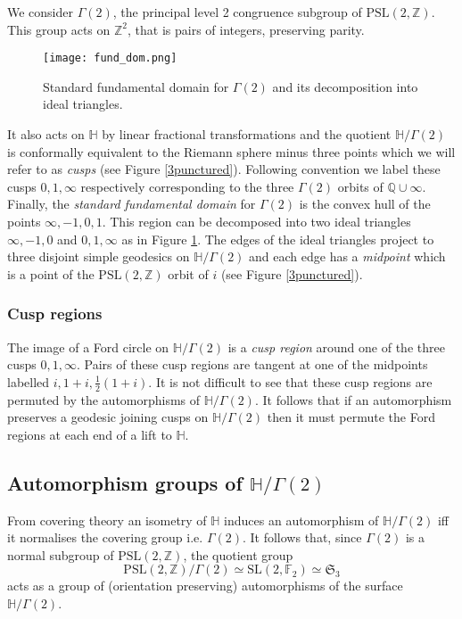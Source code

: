 \documentclass[12pt]{amsart}
\theoremstyle{plain}
\theoremstyle{definition}
\def\HH{\mathbb{H}}
\def\xx{\HH/g2}
\def\ZZ{\mathbb{Z}}
\def\QQ{\mathbb{Q}}
\def\sl2{\mathrm{PSL}(2, \ZZ)}
\def\g2{\Gamma(2)}
\def\xx{\HH/\g2}
\begin{document}
We consider $\g2$,
the principal level 2 congruence subgroup of $\sl2$.
This group acts on $\ZZ^2$, that is pairs of integers,  preserving parity.

 \begin{figure}[hb]
\begin{center}
\texttt{[image: fund\_dom.png]} 
\end{center}
\caption{Standard fundamental domain for $\g2$ and its decomposition into ideal triangles.}
\label{fund}
\end{figure}


It also acts on $\HH$ by linear fractional transformations
and the  quotient $\xx$ is conformally equivalent to the Riemann  sphere minus three points
which we will refer to as \textit{cusps}
(see Figure \ref{3punctured}). 
Following  convention we label these cusps $0,1,\infty$ respectively
corresponding to the three $\g2$ orbits of $\QQ \cup \infty$. 
Finally, the \textit{standard fundamental domain}  for $\g2$ 
is the convex hull of the points $\infty, -1, 0 , 1$.
This region can be decomposed into two ideal triangles 
$\infty, -1, 0 $ and $ 0 , 1,\infty$ as in Figure \ref{fund}.
The edges of the ideal triangles project to three disjoint simple geodesics on $\xx$
and each edge has a \textit{midpoint} 
which is a point of the $\sl2$ orbit of $i$ (see Figure \ref{3punctured}).



\subsubsection{Cusp regions}

The image of a Ford circle on $\xx$ is a \textit{cusp region}
around one of the three cusps $0,1,\infty$.
Pairs of these cusp regions are tangent at one of the midpoints
labelled $i, 1+i, \frac12(1+i)$.
It is not difficult to see that these cusp regions 
are permuted by the automorphisms of $\xx$.
It follows that if an automorphism preserves a geodesic  joining cusps on $\xx$
then it must permute the Ford regions at each end of a lift to $\HH$.


\subsection{Automorphism groups of $\xx$}
From covering theory an isometry  of $\HH$ 
induces an automorphism of $\xx$ iff it normalises the covering group
i.e. $\g2$.
It follows that,
since $\g2$ is a normal subgroup of $\sl2$,
 the quotient group
 $$ \sl2/\g2 \simeq \mathrm{SL}(2, \mathbb{F}_2) \simeq \mathfrak{S}_3$$
acts as a group of (orientation preserving) automorphisms of the surface $\xx$.
\end{document}
